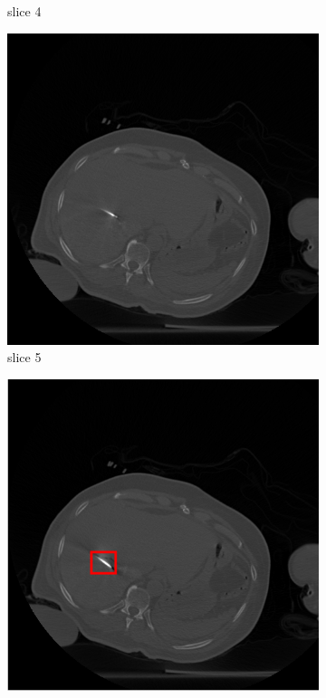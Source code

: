 \documentclass[journal]{IEEEtran}
\begin{document}
\begin{figure}[h!]
\begin{subfigure}[b]{0.24\linewidth}
 \caption{slice 4}
    \end{subfigure}
       \begin{subfigure}[b]{0.24\linewidth}
        \includegraphics[width=\textwidth]{../images/tmh/RFA2/template5.png}
 \caption{slice 5}
    \end{subfigure}
              \begin{subfigure}[b]{0.24\linewidth}
        \includegraphics[width=\textwidth]{../images/tmh/RFA2/template6_color.png}

\end{subfigure}
\end{figure}
\end{document}
